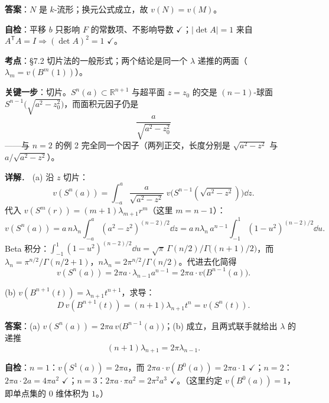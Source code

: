 \documentclass[11pt]{ctexart}
\renewcommand{\qbreak}{\needspace{0.22\textheight}}
\begin{document}
\textbf{答案}：$N$ 是 $k$-流形；换元公式成立，故 $v(N)=v(M)$。

\textbf{自检}：平移 $b$ 只影响 $F$ 的常数项、不影响导数 $\checkmark$；$|\det A|=1$ 来自 $A^{\mathsf T}A=I\Rightarrow(\det A)^2=1$ $\checkmark$。

\qbreak
{}\label{ax11}

\textbf{考点}：§7.2 切片法的一般形式；两个结论是同一个 $\lambda$ 递推的两面（$\lambda_m=v(B^m(1))$）。

\textbf{关键一步}：切片。$S^n(a)\subset\mathbb{R}^{n+1}$ 与超平面 $z=z_0$ 的交是 $(n-1)$-球面 $S^{n-1}\bigl(\sqrt{a^2-z_0^2}\bigr)$，而面积元因子仍是
\[ \frac{a}{\sqrt{a^2-z_0^2}} \]
——与 $n=2$ 的例 2 完全同一个因子（两列正交，长度分别是 $\sqrt{a^2-z^2}$ 与 $a/\sqrt{a^2-z^2}$）。

\textbf{详解}．
(a) 沿 $z$ 切片：
\[ v(S^n(a))=\int_{-a}^{a}\frac{a}{\sqrt{a^2-z^2}}\;v\bigl(S^{n-1}(\sqrt{a^2-z^2})\bigr)\dd z. \]
代入 $v(S^{m}(r))=(m+1)\lambda_{m+1}r^m$（这里 $m=n-1$）：
\[ v(S^n(a))=a\,n\lambda_n\int_{-a}^{a}(a^2-z^2)^{(n-2)/2}\dd z=a\,n\lambda_n\,a^{n-1}\!\!\int_{-1}^{1}(1-u^2)^{(n-2)/2}\dd u. \]
Beta 积分：$\int_{-1}^{1}(1-u^2)^{(n-2)/2}\dd u=\sqrt{\pi}\,\Gamma(n/2)/\Gamma\bigl((n+1)/2\bigr)$，而 $\lambda_n=\pi^{n/2}/\Gamma(n/2+1)$，$n\lambda_n=2\pi^{n/2}/\Gamma(n/2)$。代进去化简得
\[ v(S^n(a))=2\pi a\cdot\lambda_{n-1}a^{n-1}=2\pi a\cdot v\bigl(B^{n-1}(a)\bigr). \]

(b) $v(B^{n+1}(t))=\lambda_{n+1}t^{n+1}$，求导：
\[ D\,v(B^{n+1}(t))=(n+1)\lambda_{n+1}t^n=v(S^n(t)). \]

\textbf{答案}：(a) $v(S^n(a))=2\pi a\,v\bigl(B^{n-1}(a)\bigr)$；(b) 成立，且两式联手就给出 $\lambda$ 的递推
\[ (n+1)\lambda_{n+1}=2\pi\lambda_{n-1}. \]

\textbf{自检}：$n=1$：$v(S^1(a))=2\pi a$，而 $2\pi a\cdot v(B^0(a))=2\pi a\cdot1$ $\checkmark$；$n=2$：$2\pi a\cdot2a=4\pi a^2$ $\checkmark$；$n=3$：$2\pi a\cdot\pi a^2=2\pi^2a^3$ $\checkmark$。（这里约定 $v(B^0(a))=1$，即单点集的 0 维体积为 $1$。）

\qbreak
{}\label{ax12}
\end{document}
